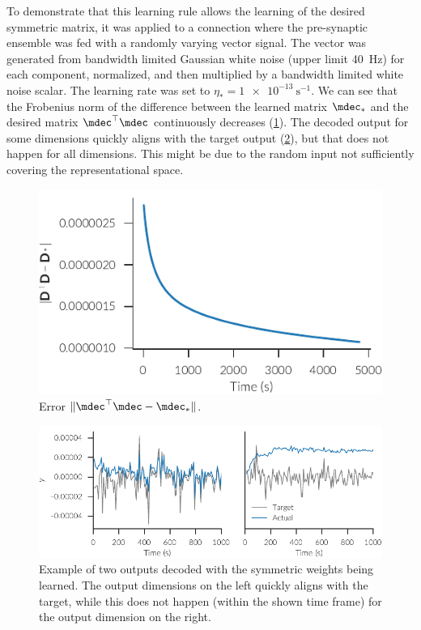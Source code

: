 To demonstrate that this learning rule allows the learning of the desired symmetric matrix, it was applied to a connection where the pre-synaptic ensemble was fed with a randomly varying vector signal.
The vector was generated from bandwidth limited Gaussian white noise (upper limit \SI{40}{\hertz}) for each component, normalized, and then multiplied by a bandwidth limited white noise scalar.
The learning rate was set to $\eta_* = \SI{1e-13}{\second^{-1}}$.
We can see that the Frobenius norm of the difference between the learned matrix $\mdec_*$ and the desired matrix $\mdec\Tr\mdec$ continuously decreases (\cref{fig:aml:grad-err}).
The decoded output for some dimensions quickly aligns with the target output (\cref{fig:aml:grad-decode}), but that does not happen for all dimensions.
This might be due to the random input not sufficiently covering the representational space.
\begin{figure}
    \centering
    \includegraphics{figures/aml-grad-err}
    \caption{Error $\lVert \mdec\Tr\mdec - \mdec_*\rVert$.}\label{fig:aml:grad-err}
\end{figure}
\begin{figure}
    \centering
    \includegraphics{figures/aml-decode}
    \caption[Example of two outputs decoded with the symmetric weights being learned.]{Example of two outputs decoded with the symmetric weights being learned. The output dimensions on the left quickly aligns with the target, while this does not happen (within the shown time frame) for the output dimension on the right.}\label{fig:aml:grad-decode}
\end{figure}

